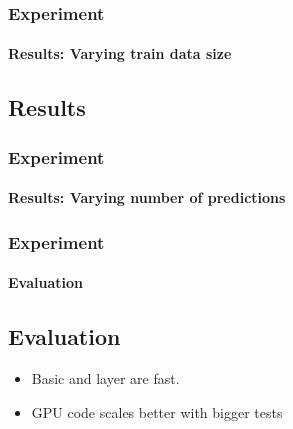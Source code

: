 \documentclass[12pt,t]{beamer}
\begin{document}
\begin{frame}
  \frametitle{Experiment}
  \framesubtitle{Results: Varying train data size}
\subsection{Results}
%
%
%


\begin{figure}[h]
  \centering
  
  \label{plot:runtime1}
\end{figure}

\end{frame}
\begin{frame}
  \frametitle{Experiment}
  \framesubtitle{Results: Varying number of predictions}
\begin{figure}[h]
  \centering
  
  \label{plot:runtime2}
\end{figure}

\end{frame}
\begin{frame}
  \frametitle{Experiment}
  \framesubtitle{Evaluation}
\subsection{Evaluation}

\begin{itemize}
  \item Basic and layer are fast.
  \item GPU code scales better with bigger tests
\end{itemize}

\end{frame}
\end{document}
